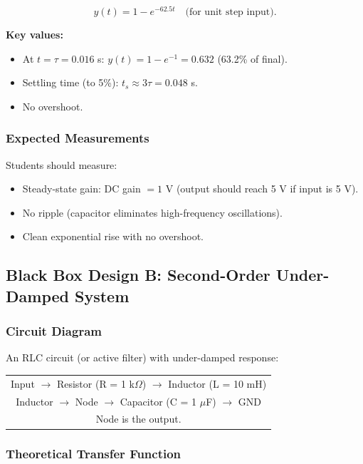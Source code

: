 \documentclass[11pt,letterpaper]{article}
\begin{document}
\begin{equation}
y(t) = 1 - e^{-62.5 t} \quad \text{(for unit step input)}.
\end{equation}

\noindent
\textbf{Key values:}
\begin{itemize}
    \item At $t = \tau = 0.016$ s: $y(t) = 1 - e^{-1} = 0.632$ (63.2\% of final).
    \item Settling time (to 5\%): $t_s \approx 3\tau = 0.048$ s.
    \item No overshoot.
\end{itemize}

\subsubsection*{Expected Measurements}

Students should measure:
\begin{itemize}
    \item Steady-state gain: DC gain $= 1$ V (output should reach 5 V if input is 5 V).
    \item No ripple (capacitor eliminates high-frequency oscillations).
    \item Clean exponential rise with no overshoot.
\end{itemize}

\subsection{Black Box Design B: Second-Order Under-Damped System}

\subsubsection*{Circuit Diagram}

An RLC circuit (or active filter) with under-damped response:

\vspace{0.3in}
\noindent
\begin{tabular}{c}
Input $\to$ Resistor (R = 1 k$\Omega$) $\to$ Inductor (L = 10 mH) \\
Inductor $\to$ Node $\to$ Capacitor (C = 1 $\mu$F) $\to$ GND \\
Node is the output.
\end{tabular}

\vspace{0.3in}

\subsubsection*{Theoretical Transfer Function}
\end{document}
